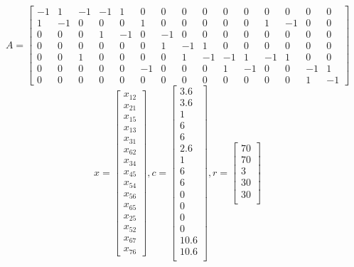 \documentclass{article}
\begin{document}
\begin{enumerate}
\begin{enumerate}
$$
A = \begin{bmatrix}
-1 &1 &-1& -1& 1& 0& 0& 0& 0& 0 & 0 & 0 &0 & 0& 0 \\
1 &-1& 0& 0 &0 &1& 0 &0& 0 &0 &0 &1 &-1 &0 &0 \\
0 &0 &0 &1 &-1& 0& -1& 0& 0& 0& 0& 0& 0& 0 &0 \\
0 &0 &0&0 &0 &0 &1 &-1 &1& 0 &0 &0 &0 &0& 0 \\
0& 0& 1 &0 &0& 0& 0& 1& -1& -1& 1 &-1&1& 0 &0 \\
0 &0 &0 &0 &0 &-1& 0& 0 &0 &1& -1& 0& 0& -1& 1 \\
0& 0& 0& 0 &0 &0& 0 &0& 0& 0& 0& 0 &0 &1& -1
\end{bmatrix}
$$
$$
x = 
\begin{bmatrix}
x_{12} \\
x_{21} \\
x_{15} \\
x_{13} \\
x_{31} \\
x_{62} \\
x_{34} \\
x_{45} \\
x_{54} \\
x_{56} \\
x_{65} \\
x_{25} \\
x_{52} \\
x_{67} \\
x_{76}
\end{bmatrix},
c = 
\begin{bmatrix}
3.6\\
3.6\\
1\\
6\\
6\\
2.6\\
1\\
6\\
6\\
0\\
0\\
0\\
0\\
10.6\\
10.6\\
\end{bmatrix},
r = 
\begin{bmatrix}
70\\
70\\
3\\
30\\
30\\

\end{bmatrix}$$
\end{enumerate}
\end{enumerate}
\end{document}
